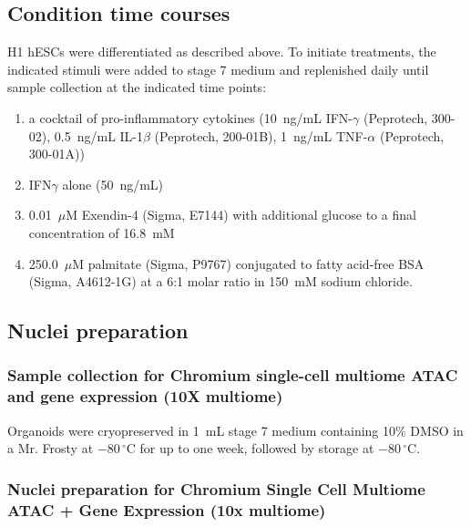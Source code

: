 \subsection{Condition time courses}

H1 hESCs were differentiated as described above. To initiate treatments, the indicated stimuli were added to stage 7 medium and replenished daily until sample collection at the indicated time points:

\begin{enumerate}
    \item a cocktail of pro-inflammatory cytokines (10~ng/mL IFN-\ensuremath{\gamma} (Peprotech, 300-02), 0.5~ng/mL IL-1\ensuremath{\beta} (Peprotech, 200-01B), 1~ng/mL TNF-\ensuremath{\alpha} (Peprotech, 300-01A))
    \item IFN\ensuremath{\gamma} alone (50~ng/mL)
    \item 0.01~\ensuremath{\mu}M Exendin-4 (Sigma, E7144) with additional glucose to a final concentration of 16.8~mM
    \item 250.0~\ensuremath{\mu}M palmitate (Sigma, P9767) conjugated to fatty acid-free BSA (Sigma, A4612-1G) at a 6:1 molar ratio in 150~mM sodium chloride.
\end{enumerate}

\subsection{Nuclei preparation}

\subsubsection{Sample collection for Chromium single-cell multiome ATAC and gene expression (10X multiome)}

Organoids were cryopreserved in 1~mL stage 7 medium containing 10\% DMSO in a Mr. Frosty at $-80\,^{\circ}\mathrm{C}$ for up to one week, followed by storage at $-80\,^{\circ}\mathrm{C}$.

\subsubsection{Nuclei preparation for Chromium Single Cell Multiome ATAC + Gene Expression (10x multiome)}


